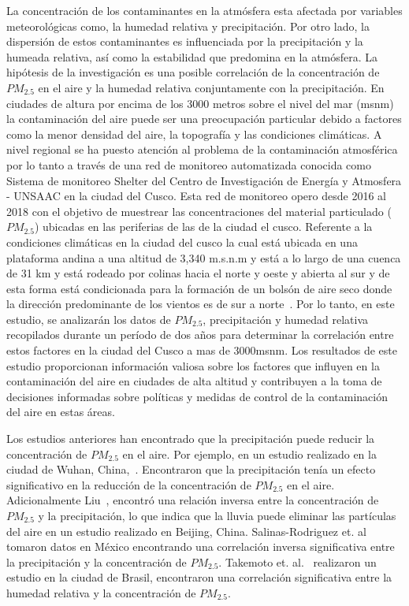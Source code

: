 \documentclass[a4paper,11pt]{article}
\begin{document}
La concentración de los contaminantes en la atmósfera esta afectada por variables meteorológicas como, la humedad relativa y precipitación. Por otro lado, la dispersión de estos contaminantes es influenciada por la precipitación y la humeada relativa, así como la estabilidad que predomina en la atmósfera. La hipótesis de la investigación es una posible correlación de la concentración de $PM_{2.5}$ en el aire y la humedad relativa conjuntamente con la precipitación. En ciudades de altura por encima de los 3000 metros sobre el nivel del mar (msnm) la contaminación del aire puede ser una preocupación particular debido a factores como la menor densidad del aire, la topografía y las condiciones climáticas. A nivel regional se ha puesto atención al problema de la contaminación atmosférica por lo tanto a través de una red de monitoreo automatizada conocida como Sistema de monitoreo Shelter del Centro de Investigación de Energía y Atmosfera - UNSAAC en la ciudad del Cusco. Esta red de monitoreo opero desde 2016 al 2018 con el objetivo de muestrear las concentraciones del material particulado ($PM_{2.5}$) ubicadas en las periferias de las de la ciudad el cusco. Referente a la condiciones climáticas en la ciudad del cusco la cual está ubicada en una plataforma andina a una altitud de 3,340 m.s.n.m y está a lo largo  de  una cuenca de 31 km y está rodeado por colinas hacia el norte y oeste y abierta al sur y de esta forma está condicionada para la formación de un bolsón de aire seco donde la dirección predominante de los vientos es de sur a norte~\cite{carac_clima}. Por lo tanto, en este estudio, se analizarán los datos de $PM_{2.5}$, precipitación y humedad relativa recopilados durante un período de dos años para determinar la correlación entre estos factores en la ciudad del Cusco a mas de 3000msnm. Los resultados de este estudio proporcionan información valiosa sobre los factores que influyen en la contaminación del aire en ciudades de alta altitud y contribuyen a la toma de decisiones informadas sobre políticas y medidas de control de la contaminación del aire en estas áreas.

Los estudios anteriores han encontrado que la precipitación puede reducir la concentración de $PM_{2.5}$ en el aire. Por ejemplo, en un estudio realizado en la ciudad de Wuhan, China,~\cite{Zhang_2020}. Encontraron que la precipitación tenía un efecto significativo en la reducción de la concentración de $PM_{2.5}$ en el aire. Adicionalmente Liu~\cite{Liu_2017}, encontró una relación inversa entre la concentración de $PM_{2.5}$ y la precipitación, lo que indica que la lluvia puede eliminar las partículas del aire en un estudio realizado en Beijing, China. Salinas-Rodriguez et. al~\cite{Salinas-Rodríguez_Ortiz-Pérez_García-Cuellar_Martínez-Salinas_2019} tomaron datos en México encontrando una correlación inversa significativa entre la precipitación y la concentración de $PM_{2.5}$. Takemoto et. al.~\cite{Takemoto_Medeiros_Ferreira_Mariani_2019} realizaron un estudio en la ciudad de Brasil, encontraron una correlación significativa entre la humedad relativa y la concentración de $PM_{2.5}$.
\end{document}
